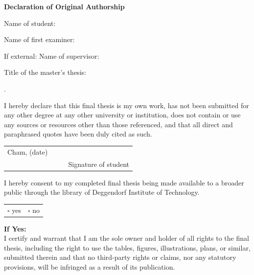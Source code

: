 \thispagestyle{empty}
\newcommand{\signature}[1]{
	\bigskip
	\noindent
	\begin{tabular*}{\linewidth}{lp{3cm}p{1cm} p{6cm}}
		Cham, (date) & \dotfill & & \dotfill \\
		& {} & & {\centering \footnotesize #1}
	\end{tabular*}
}
\newcommand{\HRule}{\hrule\vspace{0.1mm}\noindent}

\begin{center}
	{\Large\bfseries Declaration of Original Authorship}
\end{center}

\noindent
Name of student: \quad \student{}

\noindent
Name of first examiner: \quad \supervisor{}

\noindent
If external: Name of supervisor: \quad \secsupervisor{}

\noindent
Title of the master's thesis:
\noindent {\def\\{\relax\ifhmode\unskip\fi\space\ignorespaces}\thesistitleDE}
\noindent
\begin{list}{.}{
		\setlength{\leftmargin}{0pt}
		\setlength{\itemindent}{0pt}
		\setlength{\labelwidth}{0pt}
		\setlength{\labelsep}{2pt}}
	\item I hereby declare that this final thesis is my own work, has not been submitted for any other degree at any other university or institution, does not contain or use any sources or resources other than those referenced, and that all direct and paraphrased quotes have been duly cited as such.

	      \signature{Signature of student}
	\item I hereby consent to my completed final thesis being made available to a broader public through the library of Deggendorf Institute of Technology.

	      \begin{tabular}{@{}ll@{}}
		      \qquad$\square$ yes & \qquad$\square$ no \\
	      \end{tabular}

\end{list}

\noindent
\textbf{If Yes:}\\
I certify and warrant that I am the sole owner and holder of all rights to the final thesis, including the right to use the tables, figures, illustrations, plans, or similar, submitted therein and that no third-party rights or claims, nor any statutory provisions, will be infringed as a result of its publication.

